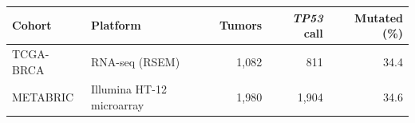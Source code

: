 \begin{tabular}{llrrr}
\toprule
Cohort & Platform & Tumors & \textit{TP53} call & Mutated (\%) \\
\midrule
TCGA-BRCA & RNA-seq (RSEM) & 1,082 & 811 & 34.4 \\
METABRIC & Illumina HT-12 microarray & 1,980 & 1,904 & 34.6 \\
\bottomrule
\end{tabular}
